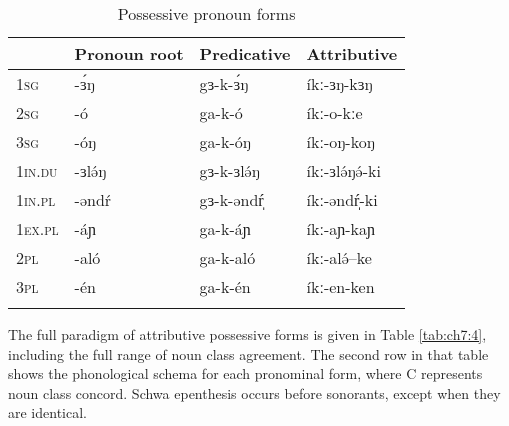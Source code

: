 \begin{table}
	\begin{tabular}[t]{llll}
	\lsptoprule
						& Pronoun root			&	Predicative &	Attributive\\
	\midrule
1\textsc{sg}			& -ɜ́ŋ		& 	gɜ-k-ɜ́ŋ 	 & íkː-ɜŋ-kɜŋ \\
2\textsc{sg}			& -ó		&	ga-k-ó	 & íkː-o-kːe \\
3\textsc{sg}			& -óŋ		&	ga-k-óŋ	 & íkː-oŋ-koŋ\\
1\textsc{in}.\textsc{du} & -ɜlə́ŋ  	&   gɜ-k-ɜlə́ŋ	 & íkː-ɜlə́ŋə́-ki\\
1\textsc{in}.\textsc{pl} &  -əndŕ  	&   gɜ-k-əndŕ̩	 & íkː-əndŕ̩-ki \\
1\textsc{ex}.\textsc{pl} &   -áɲ 	&   ga-k-áɲ 	 & íkː-aɲ-kaɲ \\
2\textsc{pl}			& -aló    	&	ga-k-aló	 & íkː-alə́--ke	\\
3\textsc{pl}			& -én 		&	ga-k-én 	 & íkː-en-ken \\
	\lspbottomrule
	\end{tabular}
	\caption{Possessive pronoun forms}
	\label{tab:ch7:3}
\end{table} 


The full paradigm of attributive possessive forms is given in Table \ref{tab:ch7:4}, including the full range of noun class agreement. The second row in that table shows the phonological schema for each pronominal form, where C represents noun class concord. Schwa epenthesis occurs before sonorants, except when they are identical.

